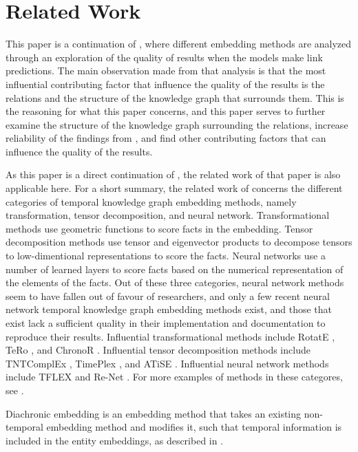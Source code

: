\section{Related Work}
\label{sec:related-work}

This paper is a continuation of \cite{P9}, where different embedding methods are analyzed through an exploration of the quality of results when the models make link predictions. The main observation made from that analysis is that the most influential contributing factor that influence the quality of the results is the relations and the structure of the knowledge graph that surrounds them. This is the reasoning for what this paper concerns, and this paper serves to further examine the structure of the knowledge graph surrounding the relations, increase reliability of the findings from \cite{P9}, and find other contributing factors that can influence the quality of the results.

As this paper is a direct continuation of \cite{P9}, the related work of that paper is also applicable here. For a short summary, the related work of \cite{P9} concerns the different categories of temporal knowledge graph embedding methods, namely transformation, tensor decomposition, and neural network. Transformational methods use geometric functions to score facts in the embedding. Tensor decomposition methods use tensor and eigenvector products to decompose tensors to low-dimentional representations to score the facts. Neural networks use a number of learned layers to score facts based on the numerical representation of the elements of the facts. Out of these three categories, neural network methods seem to have fallen out of favour of researchers, and only a few recent neural network temporal knowledge graph embedding methods exist, and those that exist lack a sufficient quality in their implementation and documentation to reproduce their results. Influential transformational methods include RotatE \cite{sun2019rotate}, TeRo \cite{xu2020tero}, and ChronoR \cite{sadeighan2021chronor}. Influential tensor decomposition methods include TNTComplEx \cite{lacroix2020tcomplex}, TimePlex \cite{jain2020timeplex}, and ATiSE \cite{xu19atise}. Influential neural network methods include TFLEX \cite{lin22tflex} and Re-Net \cite{jin2019renet}. For more examples of methods in these categores, see \cite{P9}.

Diachronic embedding is an embedding method that takes an existing non-temporal embedding method and modifies it, such that temporal information is included in the entity embeddings, as described in \cite{goel19diachronicemb}. 

